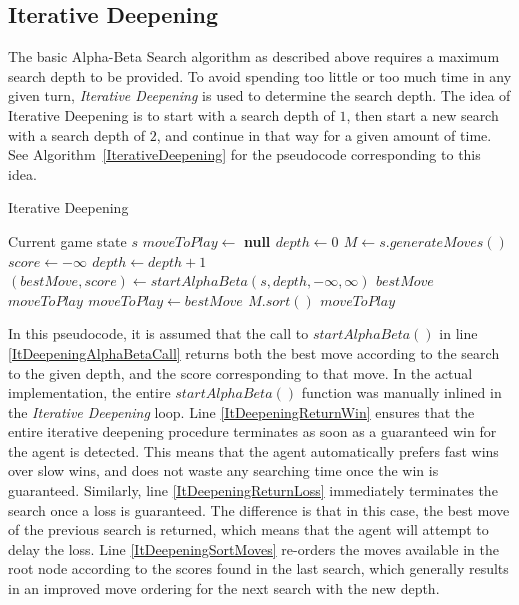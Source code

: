\documentclass{article}
\newcommand{\refalgorithm}[1]{Algorithm~\ref{#1}}
\begin{document}
\subsection{Iterative Deepening}
The basic Alpha-Beta Search algorithm as described above requires a maximum search depth to be provided. To avoid spending too little or too much time in any given turn, \emph{Iterative Deepening} is used to determine the search depth. The idea of Iterative Deepening is to start with a search depth of $1$, then start a new search with a search depth of $2$, and continue in that way for a given amount of time. See \refalgorithm{IterativeDeepening} for the pseudocode corresponding to this idea.
\begin{algorithm}
\caption{Iterative Deepening}
\label{IterativeDeepening}
\begin{algorithmic}[1]
\REQUIRE Current game state $s$
	\STATE $moveToPlay \leftarrow$ \bf{null}
	\STATE $depth \leftarrow 0$
	\STATE $M \leftarrow s.generateMoves()$
	\STATE $score \leftarrow -\infty$
		\STATE $depth \leftarrow depth + 1$
		\STATE $(bestMove, score) \leftarrow startAlphaBeta(s, depth, -\infty, \infty)$ \label{ItDeepeningAlphaBetaCall}
				\RETURN $bestMove$ \label{ItDeepeningReturnWin}
				\RETURN $moveToPlay$ \label{ItDeepeningReturnLoss}
			\ELSE
				\STATE $moveToPlay \leftarrow bestMove$
			\ENDIF
			\STATE $M.sort()$ \label{ItDeepeningSortMoves}
		\ENDIF
	\ENDWHILE
	\RETURN $moveToPlay$
\end{algorithmic}
\end{algorithm}

In this pseudocode, it is assumed that the call to $startAlphaBeta()$ in line \ref{ItDeepeningAlphaBetaCall} returns both the best move according to the search to the given depth, and the score corresponding to that move. In the actual implementation, the entire $startAlphaBeta()$ function was manually inlined in the \emph{Iterative Deepening} loop. Line \ref{ItDeepeningReturnWin} ensures that the entire iterative deepening procedure terminates as soon as a guaranteed win for the agent is detected. This means that the agent automatically prefers fast wins over slow wins, and does not waste any searching time once the win is guaranteed. Similarly, line \ref{ItDeepeningReturnLoss} immediately terminates the search once a loss is guaranteed. The difference is that in this case, the best move of the previous search is returned, which means that the agent will attempt to delay the loss. Line \ref{ItDeepeningSortMoves} re-orders the moves available in the root node according to the scores found in the last search, which generally results in an improved move ordering for the next search with the new depth.
\end{document}
